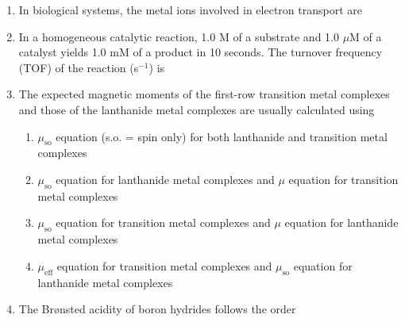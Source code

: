 \documentclass[12pt]{article}
\begin{document}
\begin{enumerate}
\item In biological systems, the metal ions involved in electron transport are
\begin{enumerate}
 \hfill{}
\end{enumerate}

\item In a homogeneous catalytic reaction, 1.0 M of a substrate and 1.0 $\mu$M of a catalyst yields 1.0 mM of a product in 10 seconds. The turnover frequency (TOF) of the reaction (s$^{-1}$) is
\begin{enumerate}
   \hfill{}
\end{enumerate}


\item The expected magnetic moments of the first-row transition metal complexes and those of the lanthanide metal complexes are usually calculated using
\begin{enumerate}
\item  $\mu_{\text{so}}$ equation (s.o. = spin only) for both lanthanide and transition metal complexes
\item  $\mu_{\text{so}}$ equation for lanthanide metal complexes and $\mu$ equation for transition metal complexes
\item  $\mu_{\text{so}}$ equation for transition metal complexes and $\mu$ equation for lanthanide metal complexes
\item  $\mu_{\text{eff}}$ equation for transition metal complexes and $\mu_{\text{so}}$ equation for lanthanide metal complexes    \hfill{}
\end{enumerate}




\item The Brønsted acidity of boron hydrides follows the order


\end{enumerate}
\end{document}

